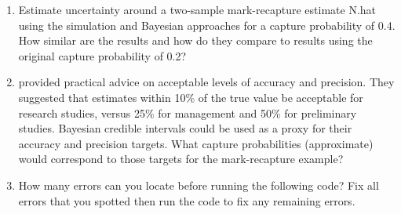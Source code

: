 \documentclass[
]{krantz}
\begin{document}
\begin{enumerate}
\def\labelenumi{\arabic{enumi}.}
\item
  Estimate uncertainty around a two-sample mark-recapture estimate N.hat using the simulation and Bayesian approaches for a capture probability of 0.4. How similar are the results and how do they compare to results using the original capture probability of 0.2?
\item
  \citet{robson.regier_1964} provided practical advice on acceptable levels of accuracy and precision. They suggested that estimates within 10\% of the true value be acceptable for research studies, versus 25\% for management and 50\% for preliminary studies. Bayesian credible intervals could be used as a proxy for their accuracy and precision targets. What capture probabilities (approximate) would correspond to those targets for the mark-recapture example?
\item
  How many errors can you locate before running the following code? Fix all errors that you spotted then run the code to fix any remaining errors.
\end{enumerate}
\end{document}
